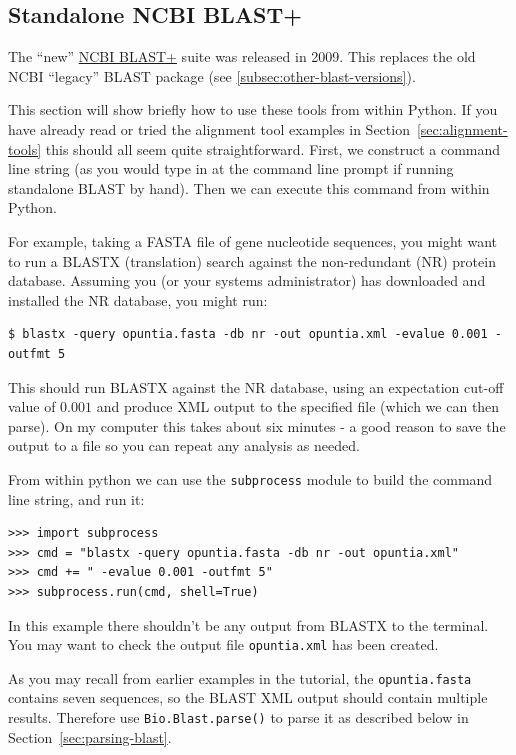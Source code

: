 \subsection{Standalone NCBI BLAST+}

The ``new''
\href{https://blast.ncbi.nlm.nih.gov/Blast.cgi?CMD=Web&PAGE_TYPE=BlastDocs&DOC_TYPE=Download}
{NCBI BLAST+} suite was released in 2009. This replaces the old NCBI ``legacy'' BLAST
package (see \ref{subsec:other-blast-versions}).

This section will show briefly how to use these tools from within Python. If you have
already read or tried the alignment tool examples in Section~\ref{sec:alignment-tools}
this should all seem quite straightforward. First, we construct a command line string
(as you would type in at the command line prompt if running standalone BLAST by hand).
Then we can execute this command from within Python.

For example, taking a FASTA file of gene nucleotide sequences, you might want to
run a BLASTX (translation) search against the non-redundant (NR) protein database.
Assuming you (or your systems administrator) has downloaded and installed the NR
database, you might run:

\begin{verbatim}
$ blastx -query opuntia.fasta -db nr -out opuntia.xml -evalue 0.001 -outfmt 5
\end{verbatim}

This should run BLASTX against the NR database, using an expectation cut-off value
of $0.001$ and produce XML output to the specified file (which we can then parse).
On my computer this takes about six minutes - a good reason to save the output
to a file so you can repeat any analysis as needed.

From within python we can use the \verb|subprocess| module to build the command line
string, and run it:

\begin{verbatim}
>>> import subprocess
>>> cmd = "blastx -query opuntia.fasta -db nr -out opuntia.xml"
>>> cmd += " -evalue 0.001 -outfmt 5"
>>> subprocess.run(cmd, shell=True)
\end{verbatim}

In this example there shouldn't be any output from BLASTX to the terminal. You may want
to check the output file \verb|opuntia.xml| has been created.

As you may recall from earlier examples in the tutorial, the \verb|opuntia.fasta|
contains seven sequences, so the BLAST XML output should contain multiple results.
Therefore use \verb|Bio.Blast.parse()| to parse it as described below in
Section~\ref{sec:parsing-blast}.

